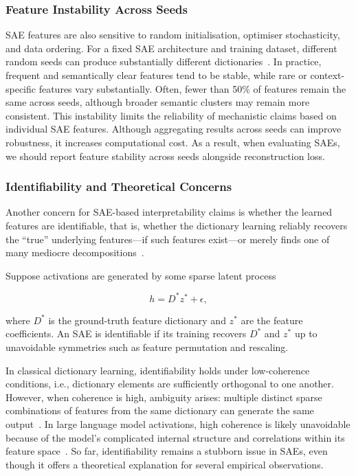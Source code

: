 \subsubsection{Feature Instability Across Seeds}

SAE features are also sensitive to random initialisation, optimiser stochasticity, and data ordering. For a fixed SAE architecture and training dataset, different random seeds can produce substantially different dictionaries~. In practice, frequent and semantically clear features tend to be stable, while rare or context-specific features vary substantially. Often, fewer than 50\% of features remain the same across seeds, although broader semantic clusters may remain more consistent. This instability limits the reliability of mechanistic claims based on individual SAE features. Although aggregating results across seeds can improve robustness, it increases computational cost. As a result, when evaluating SAEs, we should report feature stability across seeds alongside reconstruction loss.

\subsubsection{Identifiability and Theoretical Concerns}
\label{subsubsec: sae limitation}
Another concern for SAE-based interpretability claims is whether the learned features are identifiable, that is, whether the dictionary learning reliably recovers the ``true'' underlying features---if such features exist---or merely finds one of many mediocre decompositions~.

\begin{definitionbox}[Identifiability]
Suppose activations are generated by some sparse latent process

\[
h = D^{*} z^{*} + \epsilon ,
\]

where \(D^{*}\) is the ground-truth feature dictionary and
\(z^{*}\) are the feature coefficients. An SAE is identifiable if its training recovers \(D^{*}\) and \(z^{*}\)
up to unavoidable symmetries such as feature permutation and rescaling.
\end{definitionbox}

In classical dictionary learning, identifiability holds under low-coherence conditions, i.e., dictionary elements are sufficiently orthogonal to one another. However, when coherence is high, ambiguity arises: multiple distinct sparse combinations of features from the same dictionary can generate the same output~. In large language model activations, high coherence is likely unavoidable because of the model's complicated internal structure and correlations within its feature space~. So far, identifiability remains a stubborn issue in SAEs, even though it offers a theoretical explanation for several empirical observations.


